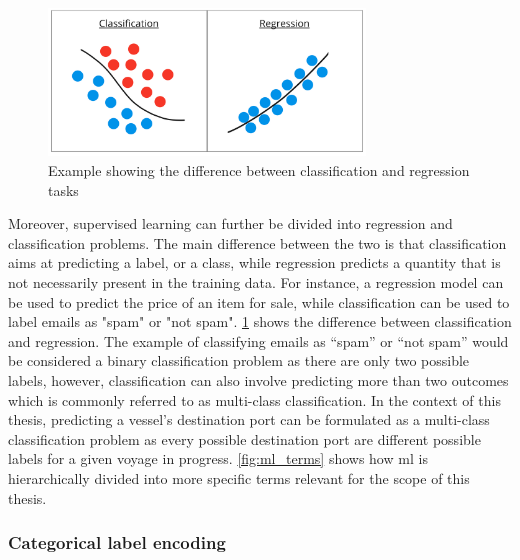 \begin{figure}[htbp]  %
    \centering
    \includegraphics[width=0.75\textwidth]{figures/class_regg}
    \caption{Example showing the difference between classification and regression tasks}
    \label{fig:classification_regression}
\end{figure}

Moreover, supervised learning can further be divided into regression and classification problems. The main difference between the two is that classification aims at predicting a label, or a class, while regression predicts a quantity that is not necessarily present in the training data. For instance, a regression model can be used to predict the price of an item for sale, while classification can be used to label emails as "spam" or "not spam". \cref{fig:classification_regression} shows the difference between classification and regression. The example of classifying emails as ``spam'' or ``not spam'' would be considered a binary classification problem as there are only two possible labels, however, classification can also involve predicting more than two outcomes which is commonly referred to as multi-class classification. In the context of this thesis, predicting a vessel's destination port can be formulated as a multi-class classification problem as every possible destination port are different possible labels for a given voyage in progress. \cref{fig:ml_terms} shows how \acrshort{ml} is hierarchically divided into more specific terms relevant for the scope of this thesis.

\subsubsection{Categorical label encoding}
\label{sec:label_encoding}

